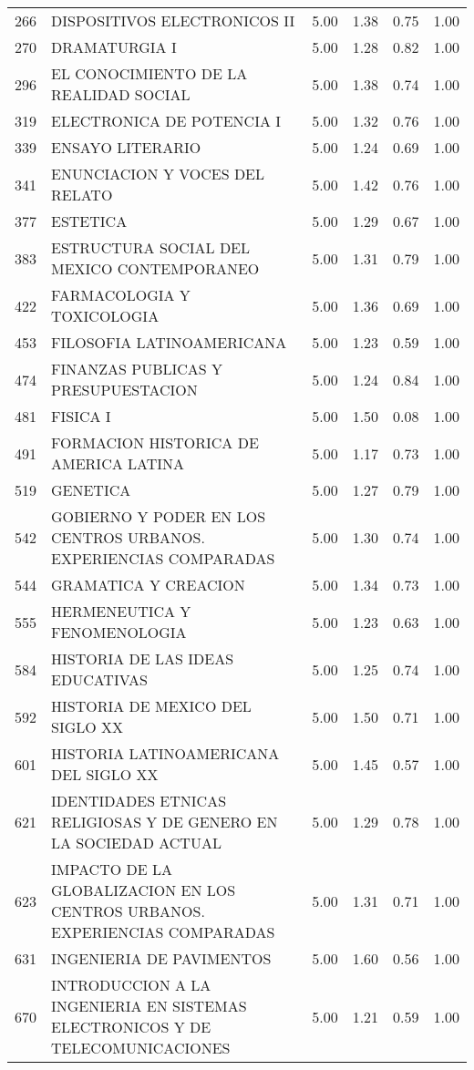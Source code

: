 \documentclass[12pt]{article}
\begin{document}
\begin{table}[ht]
\begin{tabular}{rlrrrr}
  266 & DISPOSITIVOS ELECTRONICOS II & 5.00 & 1.38 & 0.75 & 1.00 \\ 
  270 & DRAMATURGIA I & 5.00 & 1.28 & 0.82 & 1.00 \\ 
  296 & EL CONOCIMIENTO DE LA REALIDAD SOCIAL & 5.00 & 1.38 & 0.74 & 1.00 \\ 
  319 & ELECTRONICA DE POTENCIA I & 5.00 & 1.32 & 0.76 & 1.00 \\ 
  339 & ENSAYO LITERARIO & 5.00 & 1.24 & 0.69 & 1.00 \\ 
  341 & ENUNCIACION Y VOCES DEL RELATO & 5.00 & 1.42 & 0.76 & 1.00 \\ 
  377 & ESTETICA & 5.00 & 1.29 & 0.67 & 1.00 \\ 
  383 & ESTRUCTURA SOCIAL DEL MEXICO CONTEMPORANEO & 5.00 & 1.31 & 0.79 & 1.00 \\ 
  422 & FARMACOLOGIA Y TOXICOLOGIA & 5.00 & 1.36 & 0.69 & 1.00 \\ 
  453 & FILOSOFIA LATINOAMERICANA & 5.00 & 1.23 & 0.59 & 1.00 \\ 
  474 & FINANZAS PUBLICAS Y PRESUPUESTACION & 5.00 & 1.24 & 0.84 & 1.00 \\ 
  481 & FISICA I & 5.00 & 1.50 & 0.08 & 1.00 \\ 
  491 & FORMACION HISTORICA DE AMERICA LATINA & 5.00 & 1.17 & 0.73 & 1.00 \\ 
  519 & GENETICA & 5.00 & 1.27 & 0.79 & 1.00 \\ 
  542 & GOBIERNO Y PODER EN LOS CENTROS URBANOS. EXPERIENCIAS COMPARADAS & 5.00 & 1.30 & 0.74 & 1.00 \\ 
  544 & GRAMATICA Y CREACION & 5.00 & 1.34 & 0.73 & 1.00 \\ 
  555 & HERMENEUTICA Y FENOMENOLOGIA & 5.00 & 1.23 & 0.63 & 1.00 \\ 
  584 & HISTORIA DE LAS IDEAS EDUCATIVAS & 5.00 & 1.25 & 0.74 & 1.00 \\ 
  592 & HISTORIA DE MEXICO DEL SIGLO XX & 5.00 & 1.50 & 0.71 & 1.00 \\ 
  601 & HISTORIA LATINOAMERICANA DEL SIGLO XX & 5.00 & 1.45 & 0.57 & 1.00 \\ 
  621 & IDENTIDADES ETNICAS RELIGIOSAS Y DE GENERO EN LA SOCIEDAD ACTUAL & 5.00 & 1.29 & 0.78 & 1.00 \\ 
  623 & IMPACTO DE LA GLOBALIZACION EN LOS CENTROS URBANOS. EXPERIENCIAS COMPARADAS & 5.00 & 1.31 & 0.71 & 1.00 \\ 
  631 & INGENIERIA DE PAVIMENTOS & 5.00 & 1.60 & 0.56 & 1.00 \\ 
  670 & INTRODUCCION A LA INGENIERIA EN SISTEMAS ELECTRONICOS Y DE TELECOMUNICACIONES & 5.00 & 1.21 & 0.59 & 1.00 \\ 

\end{tabular}
\end{table}
\end{document}
